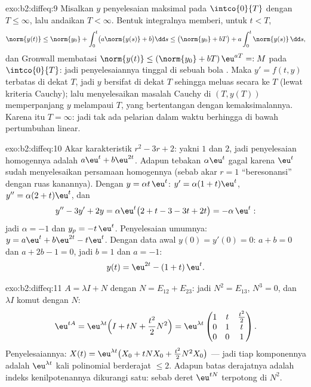 \begin{solution}{exo:b2:diffeq:9}
Misalkan $y$ penyelesaian maksimal pada $\intco{0}{T}$ dengan $T \leq \infty$,
lalu andaikan $T < \infty$. Bentuk integralnya memberi, untuk $t < T$,
\[
\norm{y(t)} \leq \norm{y_0} + \int_0^t \bigl(a\norm{y(s)} +
b\bigr)\dd s
\leq \bigl(\norm{y_0} + bT\bigr) + a\int_0^t\norm{y(s)}\,\dd s ,
\]
dan Gronwall membatasi $\norm{y(t)} \leq (\norm{y_0} +
bT)\,\eu^{aT} =: M$ pada $\intco{0}{T}$: jadi penyelesaiannya tinggal di sebuah
bola . Maka $y' = f(t, y)$ terbatas di dekat $T$, jadi $y$ bersifat
 di dekat $T$ sehingga meluas secara  ke $T$ (lewat kriteria
Cauchy); lalu menyelesaikan masalah Cauchy di $(T, y(T))$ memperpanjang $y$
melampaui $T$, yang bertentangan dengan kemaksimalannya. Karena itu $T = \infty$: jadi tak ada
pelarian dalam waktu berhingga di bawah pertumbuhan linear.
\end{solution}

\begin{solution}{exo:b2:diffeq:10}
Akar karakteristik $r^2 - 3r + 2$: yakni $1$ dan $2$, jadi
penyelesaian homogennya adalah $a\eu^t + b\eu^{2t}$. Adapun tebakan
$\alpha\eu^t$ gagal karena $\eu^t$ sudah menyelesaikan
persamaan homogennya (sebab akar $r = 1$ ``beresonansi'' dengan
ruas kanannya). Dengan $y = \alpha t\,\eu^t$: $y' = \alpha(1 +
t)\eu^t$, $y'' = \alpha(2 + t)\eu^t$, dan
\[
y'' - 3y' + 2y = \alpha\eu^t\bigl(2 + t - 3 - 3t + 2t\bigr)
= -\alpha\,\eu^t :
\]
jadi $\alpha = -1$ dan $y_p = -t\,\eu^t$. Penyelesaian umumnya: $y = a\eu^t
+ b\eu^{2t} - t\eu^t$. Dengan data awal $y(0) = y'(0) = 0$: $a + b
= 0$ dan $a + 2b - 1 = 0$, jadi $b = 1$ dan $a = -1$:
\[
y(t) = \eu^{2t} - (1 + t)\,\eu^{t} .
\]

\end{solution}

\begin{solution}{exo:b2:diffeq:11}
$A = \lambda I + N$ dengan $N = E_{12} + E_{23}$: jadi $N^2 = E_{13}$,
$N^3 = 0$, dan $\lambda I$ komut dengan $N$:
\[
\eu^{tA} = \eu^{\lambda t}\Bigl(I + tN +
\frac{t^2}{2}N^2\Bigr)
= \eu^{\lambda t}\begin{pmatrix}
1 & t & \frac{t^2}{2}\\
0 & 1 & t\\
0 & 0 & 1
\end{pmatrix}.
\]
Penyelesaiannya: $X(t) = \eu^{\lambda t}\bigl(X_0 + tNX_0 +
\frac{t^2}2N^2X_0\bigr)$ --- jadi tiap komponennya adalah $\eu^{\lambda
t}$ kali polinomial berderajat $\leq 2$. Adapun batas derajatnya adalah
indeks kenilpotenannya dikurangi satu: sebab deret $\eu^{tN}$
terpotong di $N^2$.
\end{solution}

